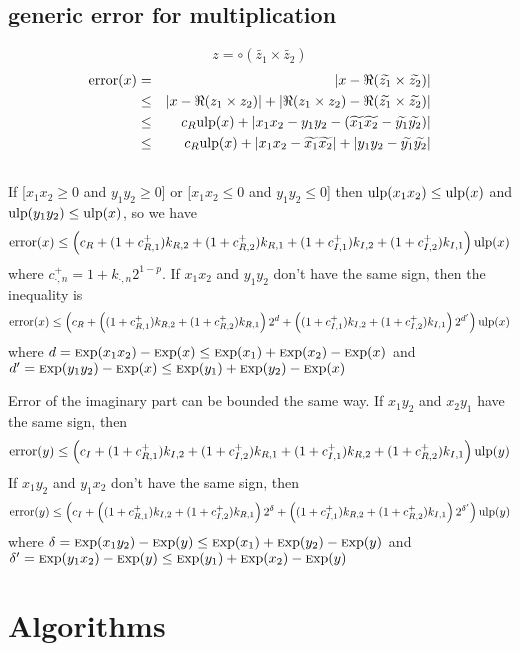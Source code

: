 \documentclass {article}
\DeclareMathOperator{\error}{error}
\newcommand {\Ulp}{{\rm ulp}}
\newcommand {\Exp}{{\rm \textsc exp}}
\begin{document}
\subsection {generic error for multiplication}

\[
z=\circ(\widetilde{z_1}\times\widetilde{z_2})
\]
\begin{eqnarray}\nonumber
\error(x)&=&|x-\Re(\widetilde{z_1}\times \widetilde{z_2})|\\\nonumber &\leq&
|x-\Re(z_1\times z_2)|+|\Re(z_1\times
z_2)-\Re(\widetilde{z_1}\times\widetilde{z_2})| \\\nonumber &\leq&
c_R\Ulp(x)+|x_1x_2-y_1y_2-(\widetilde{x_1}\widetilde{x_2}-\widetilde{y_1}\widetilde{y_2})|
\\\nonumber &\leq&
c_R\Ulp(x)+|x_1x_2-\widetilde{x_1}\widetilde{x_2}|+|y_1y_2-\widetilde{y_1}\widetilde{y_2}|
\\\nonumber
\end{eqnarray}
If [$x_1x_2 \geq 0$ and $y_1y_2 \geq 0$] or [$x_1x_2 \leq 0$ and $y_1y_2 \leq
  0$] then $\Ulp(x_1x_2) \leq \Ulp(x)$ and $\Ulp(y_1y_2) \leq \Ulp(x)$, so we
have
\[
\error(x) \leq \left(c_R + (1+c_{R,1}^+)k_{R,2} + (1+c_{R,2}^+)k_{R,1} +
(1+c_{I,1}^+)k_{I,2} + (1+c_{I,2}^+)k_{I,1} \right) \Ulp(x)
\]
where $c_{\cdot,n}^+ = 1+k_{\cdot,n}2^{1-p}$.
If $x_1x_2$ and $y_1y_2$ don't have the same sign, then the inequality is
\[
\error(x) \leq \left( c_R + \left( (1+c_{R,1}^+)k_{R,2} + (1+c_{R,2}^+)k_{R,1}
\right)2^d + \left( (1+c_{I,1}^+)k_{I,2} + (1+c_{I,2}^+)k_{I,1} \right)2^{d'}
\right) \Ulp(x)
\]
where $d = \Exp(x_1x_2)-\Exp(x) \leq \Exp(x_1)+\Exp(x_2)-\Exp(x)$ and $d' =
\Exp(y_1y_2)-\Exp(x) \leq \Exp(y_1)+\Exp(y_2)-\Exp(x)$

Error of the imaginary part can be bounded the same way. If $x_1y_2$ and
$x_2y_1$ have the same sign, then
\[
\error(y) \leq \left(c_I + (1+c_{R,1}^+)k_{I,2} + (1+c_{I,2}^+)k_{R,1} +
(1+c_{I,1}^+)k_{R,2} + (1+c_{R,2}^+)k_{I,1} \right) \Ulp(y)
\]
If $x_1y_2$ and $y_1x_2$ don't have the same sign, then
\[
\error(y) \leq \left( c_I + \left( (1+c_{R,1}^+)k_{I,2} + (1+c_{I,2}^+)k_{R,1}
\right)2^{\delta} + \left( (1+c_{I,1}^+)k_{R,2} + (1+c_{R,2}^+)k_{I,1} \right)
2^{\delta'}\right) \Ulp(y)
\]
where $\delta = \Exp(x_1y_2)-\Exp(y) \leq \Exp(x_1)+\Exp(y_2)-\Exp(y)$ and
$\delta' = \Exp(y_1x_2)-\Exp(y) \leq \Exp(y_1)+\Exp(x_2)-\Exp(y)$


\section {Algorithms}
\end{document}
